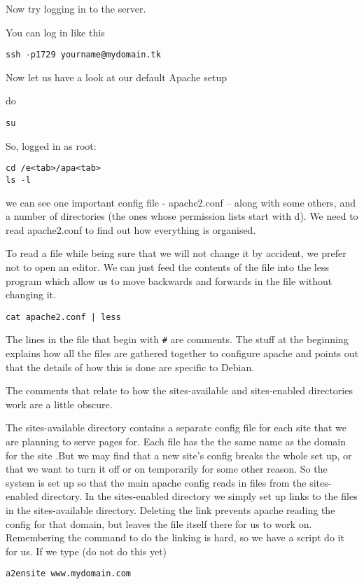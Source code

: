 \documentclass[12pt, a4paper]{article}
\begin{document}
Now try logging in to the server.

You can log in like this

\begin{verbatim}
ssh -p1729 yourname@mydomain.tk
\end{verbatim}
Now let us have a look at our default Apache setup

do 
\begin{verbatim}
su
\end{verbatim}

So, logged in as root:

\begin{verbatim}
cd /e<tab>/apa<tab>
ls -l
\end{verbatim}
we can see one important config file - apache2.conf – along with some others, and a number of directories (the ones whose permission lists start with d).
We need to read apache2.conf to find out how everything is organised.

To read a file while being sure that we will not change it by accident, we prefer not to open an editor. We can just feed the contents of the file into the less program which allow us to move backwards and forwards in the file without changing it.

\begin{verbatim}
cat apache2.conf | less
\end{verbatim}
The lines in the file that begin with \verb|#| are comments. The stuff at the beginning explains how all the files are gathered together to configure apache and points out that the details of how this is done are specific to Debian.

The comments that relate to how the sites-available and sites-enabled directories work are a little obscure.

The sites-available directory contains a separate config file for each site that we are planning to serve pages for. Each file has the the same name as the domain for the site .But we may find that a new site’s config breaks the whole set up, or that we want to turn it off or on temporarily for some other reason. So the system is set up so that the main apache config reads in files from the sites-enabled directory. In the sites-enabled directory we simply set up links to the files in the sites-available directory. Deleting the link prevents apache reading the config for that domain, but leaves the file itself there for us to work on. Remembering the command to do the linking is hard, so we have a script do it for us. If we type (do not do this yet)
\begin{verbatim}
a2ensite www.mydomain.com
\end{verbatim}
\end{document}

